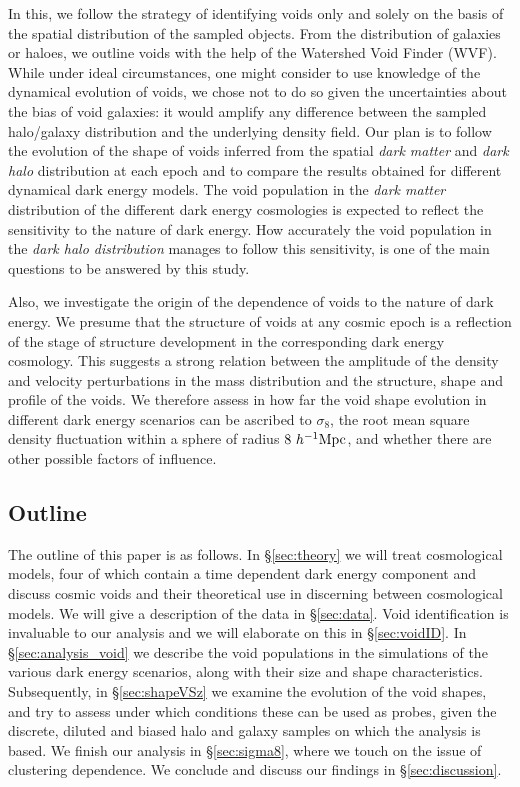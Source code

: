 In this, we follow the strategy of identifying voids only and solely on the basis of the spatial 
distribution of the sampled objects. From the distribution of galaxies or haloes, we outline voids 
with the help of the Watershed Void Finder (WVF). While under ideal circumstances, one might consider 
to use knowledge of the dynamical evolution of voids, we chose not to do so given the uncertainties 
about the bias of void galaxies: it would amplify any difference between the sampled halo/galaxy 
distribution and the underlying density field. Our plan is to follow the evolution of the shape of 
voids inferred from the spatial \textit{dark matter} and \textit{dark halo} distribution at each epoch and to compare 
the results obtained for different dynamical dark energy models. The void population in the \textit{dark matter} distribution 
of the different dark energy cosmologies is expected to reflect the sensitivity to the nature of dark energy. How 
accurately the void population in the \textit{dark halo distribution} manages to follow this sensitivity, is one 
of the main questions to be answered by this study.

Also, we investigate the origin of the dependence of voids to the nature of dark energy. We 
presume that the structure of voids at any cosmic epoch is a reflection of the stage of structure 
development in the corresponding dark energy cosmology. This suggests a strong relation between 
the amplitude of the density and velocity perturbations in the mass distribution and the structure, 
shape and profile of the voids. We therefore assess in how far the void shape evolution in different 
dark energy scenarios can be ascribed to $\sigma_8$, the root mean square density fluctuation within 
a sphere of radius $8~h^{-1} {\rm Mpc}$, and whether there are other possible factors of influence. 

\subsection{Outline}
\label{sec:outline}
The outline of this paper is as follows. In \S\ref{sec:theory} we will treat cosmological models, four of which contain a time dependent 
dark energy component and discuss cosmic voids and their theoretical use in discerning between cosmological models. We will give a 
description of the data in \S\ref{sec:data}. Void identification is invaluable to our analysis and we will elaborate on this in 
\S\ref{sec:voidID}. In \S\ref{sec:analysis_void} we describe the void populations in the simulations of the various dark energy 
scenarios, along with their size and shape characteristics. Subsequently, in \S\ref{sec:shapeVSz} we examine the evolution of 
the void shapes, and try to assess under which conditions these can be used as probes, given the discrete, diluted and biased 
halo and galaxy samples on which the analysis is based. We finish our analysis in \S\ref{sec:sigma8}, where we touch on the 
issue of clustering dependence. We conclude and discuss our findings in \S\ref{sec:discussion}. 


